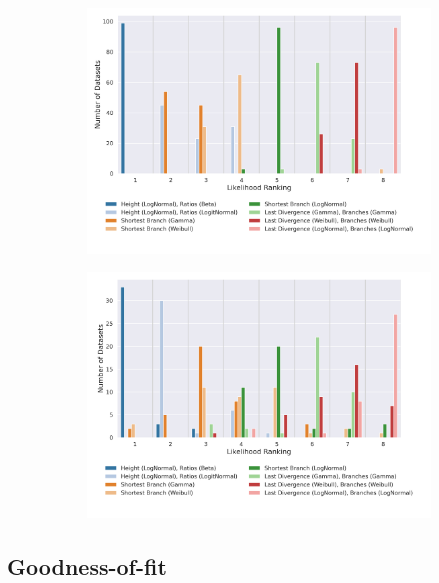 \documentclass[10pt,letterpaper]{article}
\begin{document}
\begin{figure}
	\begin{subfigure}[b]{0.45\textwidth}
		\centering
		\includegraphics[width=\textwidth]{figures/yule-400-ccd1-likelihood-ranking.png}
	\end{subfigure}
	\begin{subfigure}[b]{0.45\textwidth}
		\centering
		\includegraphics[width=\textwidth]{figures/bio-ccd1-likelihood-ranking.png}
	\end{subfigure}
	
	\label{fig:data-likelihood-ranking}
\end{figure}

\subsection*{Goodness-of-fit}
\end{document}
